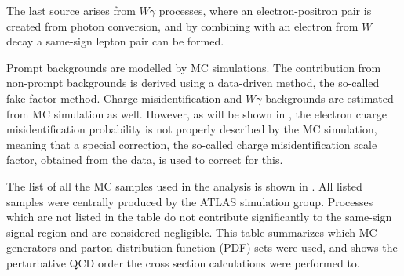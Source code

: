 The last source arises from $W\gamma$ processes, where an electron-positron pair is created from photon conversion, and by combining with an electron from $W$ decay
a same-sign lepton pair can be formed. 

Prompt backgrounds are modelled by MC simulations. 
The contribution from non-prompt backgrounds is derived using a data-driven method, the so-called fake factor method.
Charge misidentification and $W\gamma$ backgrounds are estimated from MC simulation as well. However, as will be shown in , the electron charge misidentification probability is not properly described by the MC simulation, meaning that a special correction, the so-called charge misidentification scale factor, obtained from the data, is used to correct for this.

The list of all the MC samples used in the analysis is shown in . 
All listed samples were centrally produced by the ATLAS simulation group.
Processes which are not listed in the table do not contribute
significantly to the same-sign signal region and are considered negligible.
This table summarizes which MC generators and parton distribution function (PDF) sets were used, and shows the perturbative QCD order the cross section calculations were performed to.


